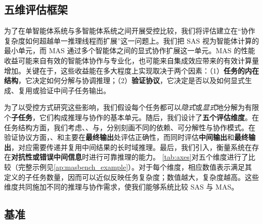 \subsection{五维评估框架}
\label{sec:five_axis_framework}

为了在单智能体系统与多智能体系统之间开展受控比较，我们将评估建立在“协作复杂度如何超越单一推理线程而扩展”这一问题上。我们把 SAS 视为智能体计算的最小单元，而 MAS 通过多个智能体之间的显式协作扩展这一单元。MAS 的性能收益可能来自有效的智能体协作与专业化，也可能来自集成效应带来的有效计算量增加。关键在于，这些收益能在多大程度上实现取决于两个因素：（1）\textbf{任务的内在结构}，它决定如何分解与协调推理；（2）\textbf{验证协议}，它决定是否以及如何显式生成、复用或验证中间子任务输出。


为了以受控方式研究这些影响，我们假设每个任务都可以\textit{隐式}或\textit{显式}地分解为有限个\textbf{子任务}，它们构成推理与协作的基本单元。随后，我们设计了\textbf{五个评估维度}。在任务结构方面，我们考虑\textbf{\depth}、\textbf{\horizon}、\textbf{\breadth}与\textbf{\myparallel}，分别刻画不同的依赖、可分解性与协作模式。在验证协议方面，\depth、\breadth{}和\myparallel{}主要在\textbf{最终输出}处评估正确性，而\horizon{}同时评估\textbf{中间输出}和\textbf{最终输出}，对应需要传递并复用中间结果的长时域推理。最后，我们引入\textbf{\robustness}，衡量系统在存在\textbf{对抗性或错误中间信息}时进行可靠推理的能力。
\cref{tab:axes}对五个维度进行了比较（完整示例见\cref{ap:masbench_example}）。对于每个维度，相应数值表示满足其定义的子任务数量，因而可以近似反映任务复杂度；数值越大，复杂度越高。这些维度共同施加不同的推理与协作需求，使我们能够系统比较 SAS 与 MAS。




 

\subsection{\ourbenchmark 基准}
\label{sec:masbench}





